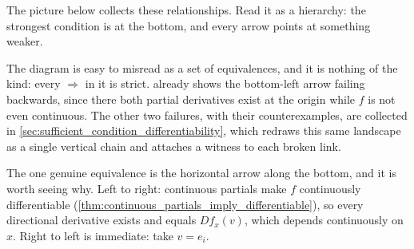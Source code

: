 The picture below collects these relationships. Read it as a hierarchy: the
strongest condition is at the bottom, and every arrow points at something weaker.

\begin{center}
\end{center}

\begin{importantremark}
The diagram is easy to misread as a set of equivalences, and it is nothing of the kind: every
$\Rightarrow$ in it is strict.  already shows the
bottom-left arrow failing backwards, since there both partial derivatives exist at the origin
while $f$ is not even continuous. The other two failures, with their counterexamples, are collected in
\cref{sec:sufficient_condition_differentiability}, which redraws this same landscape as a single
vertical chain and attaches a witness to each broken link.

The one genuine equivalence is the horizontal arrow along the bottom, and it is worth seeing
why. Left to right: continuous partials make $f$ continuously differentiable
(\cref{thm:continuous_partials_imply_differentiable}), so every directional derivative exists
and equals $Df_x(v)$, which depends continuously on $x$. Right to left is immediate: take
$v = e_i$.
\end{importantremark}

